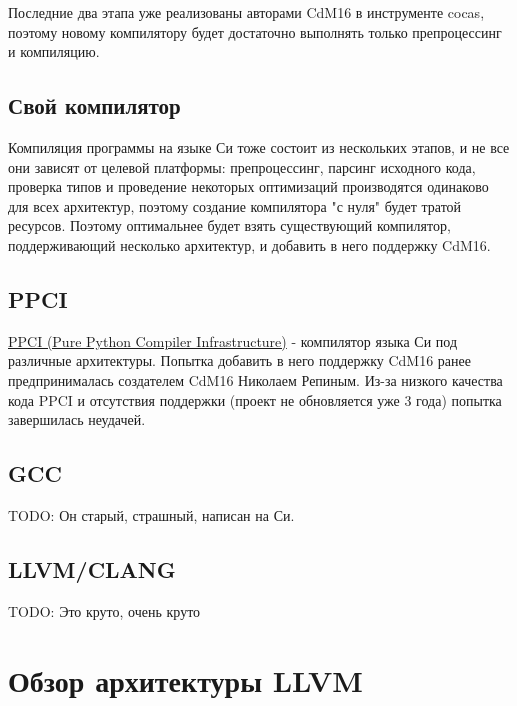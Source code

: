 \documentclass[a4paper,14pt]{extarticle}
\begin{document}
Последние два этапа уже реализованы авторами CdM16 в инструменте cocas, поэтому новому компилятору будет достаточно выполнять только препроцессинг и компиляцию. 

\subsection{Свой компилятор}

Компиляция программы на языке Си тоже состоит из нескольких этапов, и не все они зависят от целевой платформы:
препроцессинг, парсинг исходного кода, проверка типов и проведение некоторых оптимизаций производятся одинаково 
для всех архитектур, поэтому создание компилятора "с нуля" будет тратой ресурсов. 
Поэтому оптимальнее будет взять существующий компилятор, поддерживающий несколько архитектур, и добавить в него
поддержку CdM16.

\subsection{PPCI}

\href{https://github.com/windelbouwman/ppci}{PPCI (Pure Python Compiler Infrastructure)} - компилятор языка Си под различные архитектуры. Попытка добавить в него поддержку CdM16 ранее предпринималась создателем CdM16 Николаем Репиным. Из-за низкого качества кода PPCI и отсутствия поддержки (проект не обновляется уже 3 года) попытка завершилась неудачей.

\subsection{GCC}

TODO: Он старый, страшный, написан на Си.

\subsection{LLVM/CLANG}

TODO: Это круто, очень круто

\pagebreak
\section{Обзор архитектуры LLVM}
\end{document}
